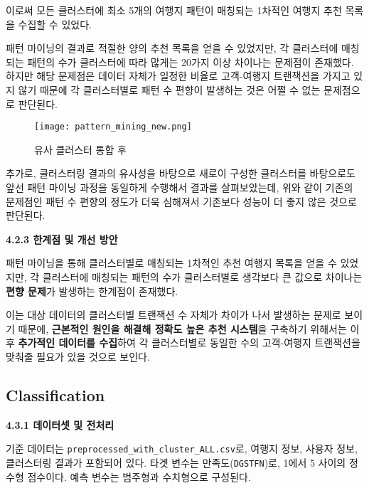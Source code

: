 \documentclass[sigconf]{acmart}
\begin{document}
\begin{CJK}{UTF8}{mj}
\vspace{0.5em}

이로써 모든 클러스터에 최소 5개의 여행지 패턴이 매칭되는 1차적인 여행지 추천 목록을 수집할 수 있었다.

패턴 마이닝의 결과로 적절한 양의 추천 목록을 얻을 수 있었지만, 각 클러스터에 매칭되는 패턴의 수가 클러스터에 따라 많게는 20가지 이상 차이나는 문제점이 존재했다. 하지만 해당 문제점은 데이터 자체가 일정한 비율로 고객-여행지 트랜잭션을 가지고 있지 않기 때문에 각 클러스터별로 패턴 수 편향이 발생하는 것은 어쩔 수 없는 문제점으로 판단된다.

\begin{figure}[H]
  \centering
  \texttt{[image: pattern\_mining\_new.png]}
  \caption{유사 클러스터 통합 후}
  \label{fig:pattern_mining_new}
\end{figure}

\vspace{0.5em}

추가로, 클러스터링 결과의 유사성을 바탕으로 새로이 구성한 클러스터를 바탕으로도 앞선 패턴 마이닝 과정을 동일하게 수행해서 결과를 살펴보았는데, 위와 같이 기존의 문제점인 패턴 수 편향의 정도가 더욱 심해져서 기존보다 성능이 더 좋지 않은 것으로 판단된다.

\vspace{0.5em}
\noindent\textbf{4.2.3 한계점 및 개선 방안}\par
패턴 마이닝을 통해 클러스터별로 매칭되는 1차적인 추천 여행지 목록을 얻을 수 있었지만, 각 클러스터에 매칭되는 패턴의 수가 클러스터별로 생각보다 큰 값으로 차이나는 \textbf{편향 문제}가 발생하는 한계점이 존재했다.

이는 대상 데이터의 클러스터별 트랜잭션 수 자체가 차이가 나서 발생하는 문제로 보이기 때문에, \textbf{근본적인 원인을 해결해 정확도 높은 추천 시스템}을 구축하기 위해서는 이후 \textbf{추가적인 데이터를 수집}하여 각 클러스터별로 동일한 수의 고객-여행지 트랜잭션을 맞춰줄 필요가 있을 것으로 보인다.


\subsection{Classification}

\vspace{0.5em}
\noindent\textbf{4.3.1 데이터셋 및 전처리}\par

기준 데이터는 \texttt{preprocessed\_with\_cluster\_ALL.csv}로, 여행지 정보, 사용자 정보, 클러스터링 결과가 포함되어 있다. 타겟 변수는 만족도(\texttt{DGSTFN})로, 1에서 5 사이의 정수형 점수이다. 예측 변수는 범주형과 수치형으로 구성된다.


\end{CJK}
\end{document}
